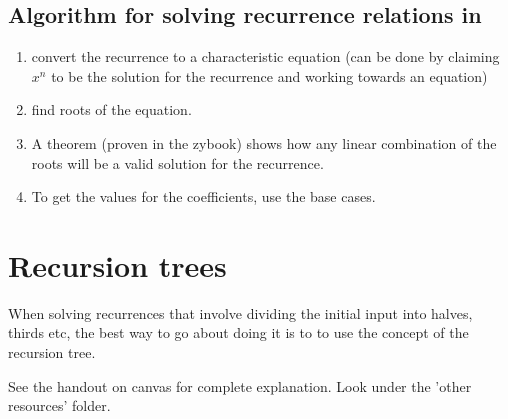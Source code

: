 \documentclass[12pt]{article}
\begin{document}
\subsection*{Algorithm for solving recurrence relations in}

\begin{enumerate}
\item convert the recurrence to a characteristic equation (can be done by claiming $x^n$ to be the solution for the recurrence and working towards an equation)
\item find roots of the equation.
\item A theorem (proven in the zybook) shows how any linear combination of the roots will be a valid solution for the recurrence.
\item To get the values for the coefficients, use the base cases.
\end{enumerate}

\section*{Recursion trees}

When solving recurrences that involve dividing the initial input into halves, thirds etc, the best way to go about doing it is to to use the concept of the recursion tree.

See the handout on canvas for complete explanation. Look under the 'other resources' folder.
\end{document}
